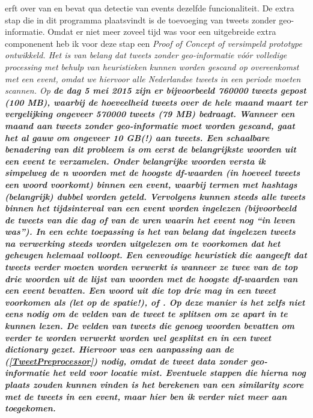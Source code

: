 {{ erft over van  en bevat qua detectie van 
events dezelfde funcionaliteit. De extra stap die in dit programma plaatsvindt 
is de toevoeging van tweets zonder geo-informatie. Omdat er niet meer zoveel 
tijd was voor een uitgebreide extra componenent heb ik voor deze stap een \it{Proof 
of Concept} of versimpeld prototype ontwikkeld.
\vl
Het is van belang dat tweets zonder geo-informatie vóór volledige processing met 
behulp van \it{heuristieken} kunnen worden gescand op overeenkomst met een event, 
omdat we hiervoor \it{alle} Nederlandse tweets in een periode moeten scannen. Op \bf{de 
dag} 5 mei 2015 zijn er bijvoorbeeld 760000 tweets gepost (100 MB), waarbij de 
hoeveelheid tweets over \bf{de hele maand} maart ter vergelijking ongeveer 570000 
tweets (79 MB) bedraagt. Wanneer een maand aan tweets zonder geo-informatie moet 
worden gescand, gaat het al gauw om ongeveer 10 GB(!) aan tweets.
\vl
Een schaalbare benadering van dit probleem is om eerst de belangrijkste woorden 
uit een event te verzamelen. Onder belangrijke woorden versta ik simpelweg de n 
woorden met de hoogste \it{df-waarden} (in hoeveel tweets een woord voorkomt) binnen 
een event, waarbij termen met hashtags (belangrijk) dubbel worden geteld. Vervolgens
kunnen steeds alle tweets binnen het tijdsinterval van een event worden ingelezen 
(bijvoorbeeld de tweets van die dag of van de uren waarin het event nog ``in leven
was''). In een echte toepassing is het van belang dat ingelezen tweets na 
verwerking steeds worden uitgelezen om te voorkomen dat het geheugen helemaal volloopt. 
\vl
Een eenvoudige heuristiek die aangeeft dat tweets verder moeten worden verwerkt 
is wanneer ze twee van de top drie woorden uit de lijst van woorden met de 
hoogste df-waarden van een event bevatten. Een woord uit die top drie mag in een 
tweet voorkomen als  (let op de spatie!),  of . Op deze 
manier is het zelfs niet eens nodig om de velden van de tweet te splitsen om ze 
apart in te kunnen lezen. De velden van tweets die genoeg woorden bevatten om 
verder te worden verwerkt worden wel gesplitst en in een tweet dictionary gezet. 
Hiervoor was een aanpassing aan de  (\ref{TweetPreprocessor}) nodig, omdat de 
tweet data zonder geo-informatie het veld voor locatie mist. Eventuele stappen 
die hierna nog plaats zouden kunnen vinden is het berekenen van een \it{similarity 
score} met de tweets in een event, maar hier ben ik verder niet meer aan 
toegekomen.


}}
